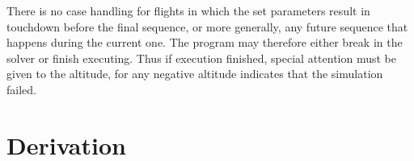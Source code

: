 \documentclass[11pt]{thesis}
\numberwithin{equation}{section}
\begin{document}
There is no case handling for flights in which the set parameters result in touchdown before the final sequence, or more generally, any future sequence that happens during the current one. The program may therefore either break in the solver or finish executing. Thus if execution finished, special attention must be given to the altitude, for any negative altitude indicates that the simulation failed.
 




\chapter{Derivation}
\newpage
\end{document}

